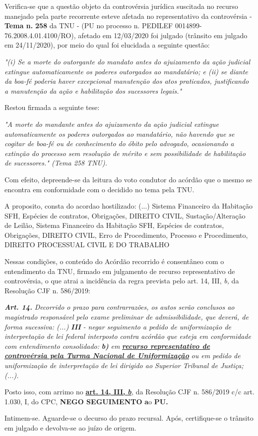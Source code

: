 \documentclass[12pt]{article}
\begin{document}
\justifying
\noindent Verifica-se que a questão objeto da controvérsia jurídica suscitada no recurso manejado pela parte recorrente esteve afetada no representativo da controvérsia - \textbf{Tema n. }\textbf{258} da TNU - (PU no processo n. PEDILEF 0014899-76.2008.4.01.4100/RO),  afetado em 12/03/2020 foi julgado (trânsito em julgado em 24/11/2020), por meio do qual foi elucidada a seguinte questão:

\noindent \textit{"(i) Se a morte do outorgante do mandato antes do ajuizamento da ação judicial extingue automaticamente os poderes outorgados ao mandatário; e (ii) se diante da boa-fé poderia haver excepcional manutenção dos atos praticados, justificando a manutenção da ação e habilitação dos sucessores legais."}

\noindent Restou firmada a seguinte tese:

\noindent \textit{"A morte do mandante antes do ajuizamento da ação judicial extingue automaticamente os poderes outorgados ao mandatário, não havendo que se cogitar de boa-fé ou de conhecimento do óbito pelo advogado, ocasionando a extinção do processo sem resolução de mérito e sem possibilidade de habilitação de sucessores." (Tema 258 TNU).}

\noindent Com efeito, depreende-se da leitura do voto condutor do acórdão que o mesmo se encontra em conformidade com o decidido no  tema pela TNU.

\noindent A proposito, consta do acordao hostilizado: (...) Sistema Financeiro da Habitação SFH, Espécies de contratos, Obrigações, DIREITO CIVIL, Sustação/Alteração de Leilão, Sistema Financeiro da Habitação SFH, Espécies de contratos, Obrigações, DIREITO CIVIL, Erro de Procedimento, Processo e Procedimento, DIREITO PROCESSUAL CIVIL E DO TRABALHO

\noindent Nessas condições, o conteúdo do Acórdão recorrido é consentâneo com o entendimento da TNU, firmado em julgamento de recurso representativo de controvérsia, o que atrai a incidência da regra prevista pelo art. 14, III, \textit{b,} da Resolução CJF n. 586/2019:

\noindent \textit{\textbf{Art. 14.}}\textit{ Decorrido o prazo para contrarrazões, os autos serão conclusos ao magistrado responsável pelo exame preliminar de admissibilidade, que deverá, de forma sucessiva: (...) }\textit{\textbf{III }}\textit{- negar seguimento a pedido de uniformização de interpretação de lei federal interposto contra acórdão que esteja em conformidade com entendimento consolidado: }\textit{\textbf{b)}}\textit{ em }\uline{\textit{\textbf{recurso representativo de controvérsia pela Turma Nacional de Uniformização}}}\textit{ ou em pedido de uniformização de interpretação de lei dirigido ao Superior Tribunal de Justiça;(...).}

\noindent Posto isso, com arrimo no \uline{\textbf{art. 14, III, }}\uline{\textit{\textbf{b}}}\textit{,} da Resolução CJF n. 586/2019 c/c art. 1.030, I, do CPC, \textbf{NEGO SEGUIMENTO }\textbf{a}o\textbf{ PU}\textbf{.}

\noindent Intimem-se. Aguarde-se o decurso do prazo recursal. Após, certifique-se o trânsito em julgado e devolva-se ao juízo de origem.
\end{document}
